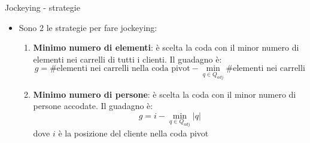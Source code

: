 \begin{frame}{Jockeying - strategie}
	\begin{itemize}
		\item Sono 2 le strategie per fare jockeying: 
		\begin{enumerate}
			\item \textbf{Minimo numero di elementi}: è scelta la coda con il minor numero di elementi nei carrelli di tutti i clienti. Il guadagno è:
			\[g = \# \text{elementi nei carrelli nella coda pivot} - \min\limits_{q \in Q_{adj}} \# \text{elementi nei carrelli}\]
			\item \textbf{Minimo numero di persone}: è scelta la coda con il minor numero di persone accodate. Il guadagno è:
			\[g = i - \min\limits_{q \in Q_{adj}} |q|\]
			dove $i$ è la posizione del cliente nella coda pivot
		\end{enumerate}
	\end{itemize}
\end{frame}